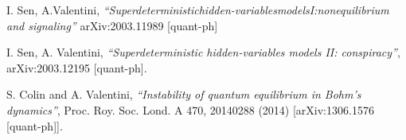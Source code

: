 \documentclass[12pt]{article}
\begin{document}
\begin{thebibliography}{99}
{
I. Sen, A.Valentini, {\sl ``Superdeterministichidden-variablesmodelsI:nonequilibrium and signaling''} arXiv:2003.11989 [quant-ph]

I. Sen, A. Valentini, {\sl ``Superdeterministic hidden-variables models II: conspiracy''}, arXiv:2003.12195 [quant-ph].

S. Colin and A. Valentini, {\sl ``Instability of quantum equilibrium in Bohm’s dynamics''}, Proc. Roy. Soc. Lond. A 470, 20140288 (2014) [arXiv:1306.1576 [quant-ph]].

}
\end{thebibliography}
\end{document}
